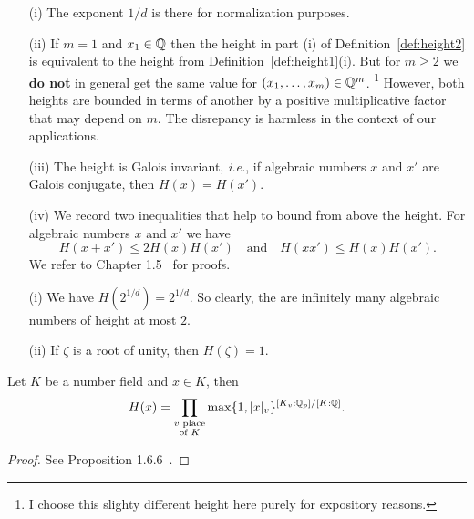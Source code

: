 \begin{remark}
  \label{rmk:heightprops}
  \begin{enumerate}
  \item [(i)] The exponent $1/d$ is there for normalization purposes.

  \item[(ii)] If $m=1$ and $x_1\in{\mathbb{Q}}$ then the height in part (i) of
    Definition~\ref{def:height2} is equivalent to the height from
    Definition~\ref{def:height1}(i). But for $m\ge 2$ we \textbf{do not} in
    general get the same value for $(x_1,\ldots,x_m)\in{\mathbb{Q}}^m$.
    \footnote{I choose this
      slighty different height here purely for expository reasons.}
    However, both heights are
    bounded in terms of another by a positive multiplicative factor that may
    depend on $m$.
    The disrepancy is harmless in the context of our applications.

  \item[(iii)] The height is Galois invariant, \textit{i.e.}, if
    algebraic numbers $x$
    and $x'$ are Galois conjugate, then $H(x)=H(x')$.

  \item[(iv)] We record two inequalities that help to bound from above
    the height. For algebraic numbers
    $x$ and $x'$ we have
    \begin{equation*}
      H(x+x')\le 2H(x)H(x')\quad\text{and}\quad H(xx')\le H(x)H(x').
    \end{equation*}
    We refer to Chapter 1.5~\cite{BG} for proofs.     
  \end{enumerate}
\end{remark}

\begin{example}
  \begin{enumerate}
  \item [(i)] We have $H(2^{1/d})=2^{1/d}$. So clearly, the are
    infinitely many algebraic numbers of height at most $2$. 

  \item[(ii)] If $\zeta$ is a root of unity, then $H(\zeta)=1$.
  \end{enumerate}
\end{example}

\begin{lemma}
  \label{lem:altheight}
  Let $K$ be a number field and $x\in K$, then
  $$H(x) = \prod_{\substack{v\text{ place} \\\text{of $K$}}}
  \max\{1,|x|_v\}^{[K_v:{\mathbb{Q}}_p]/[K:{\mathbb{Q}}]}.$$
\end{lemma}
\begin{proof}
  See Proposition 1.6.6~\cite{BG}.
\end{proof}


